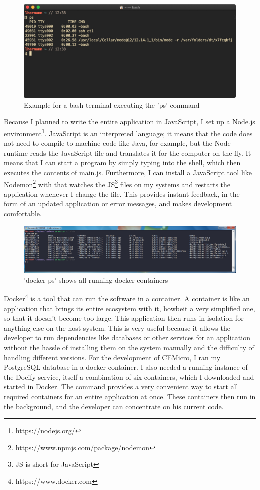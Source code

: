\begin{figure}[ht]
  \centering
  \includegraphics[width=0.75\linewidth]{assets/example-bash-window.jpg}
  \caption{Example for a bash terminal executing the 'ps' command}
\end{figure}

Because I planned to write the entire application in JavaScript, I set up a Node.js environment\footnote{https://nodejs.org/}. JavaScript is an interpreted language; it means that the code does not need to compile to machine code like Java, for example, but the Node runtime reads the JavaScript file and translates it for the computer on the fly. It means that I can start a program by simply typing  into the shell, which then executes the contents of main.js. Furthermore, I can install a JavaScript tool like Nodemon\footnote{https://www.npmjs.com/package/nodemon} with  that watches the JS\footnote{JS is short for JavaScript} files on my systems and restarts the application whenever I change the file. This provides instant feedback, in the form of an updated application or error messages, and makes development comfortable.

\begin{figure}[ht]
  \centering
  \includegraphics[width=1\linewidth]{assets/terminal-docker-ps.png}
  \caption{'docker ps' shows all running docker containers}
\end{figure}

Docker\footnote{https://www.docker.com} is a tool that can run the software in a container. A container is like an application that brings its entire ecosystem with it, howbeit a very simplified one, so that it doesn't become too large. This application then runs in isolation for anything else on the host system. This is very useful because it allows the developer to run dependencies like databases or other services for an application without the hassle of installing them on the system manually and the difficulty of handling different versions. For the development of CEMicro, I ran my PostgreSQL database in a docker container. I also needed a running instance of the Docify service, itself a combination of six containers, which I downloaded and started in Docker. The  command provides a very convenient way to start all required containers for an entire application at once. These containers then run in the background, and the developer can concentrate on his current code.

